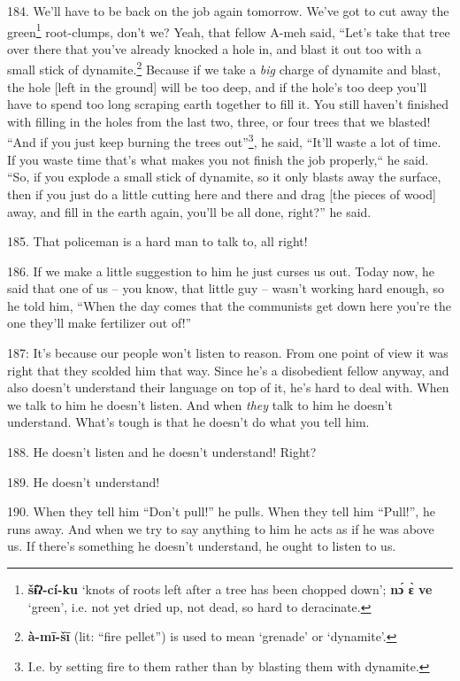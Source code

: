 184. We'll have to be back on the job again tomorrow. We've got to cut away the
green\footnote{\textbf{šɨ̂ʔ-cí-ku} `knots of roots left after a tree has been chopped down'; \textbf{nɔ́ ɛ̀ ve} `green', i.e. not yet dried up, not dead, so hard to deracinate.} root-clumps, don't we? Yeah, that fellow A-meh said, ``Let's
take that tree over there that you've already knocked a hole in, and blast it out
too with a small stick of dynamite.\footnote{\textbf{à-mī-šī} (lit: ``fire pellet'') is used to mean `grenade' or `dynamite'.} Because if we take a \textit{big} charge
of dynamite and blast, the hole [left in the ground] will be too deep, and if the
hole's too deep you'll have to spend too long scraping earth together to fill it.
You still haven't finished with filling in the holes from the last two, three,
or four trees that we blasted! ``And if you just keep burning the trees
out''\footnote{I.e. by setting fire to them rather than by blasting them with dynamite.}, he said, ``It'll waste a lot of time. If you waste time that's
what makes you not finish the job properly,`` he said. ``So, if
you explode a small stick of dynamite, so it only blasts away the surface, then
if you just do a little cutting here and there and drag [the pieces of wood] away,
and fill in the earth again, you'll be all done, right?'' he said.

185. That policeman is a hard man to talk to, all right!

186. If we make a little suggestion to him he just curses us out. Today now, he
said that one of us -- you know, that little guy -- wasn't working hard enough,
so he told him, ``When the day comes that the communists get down here you're the
one they'll make fertilizer out of!''

 187: It's because our people won't listen to reason.
From one point of view it was right that they scolded him that way. Since he's
a disobedient fellow anyway, and also doesn't understand their language on top
of it, he's hard to deal with. When we talk to him he doesn't listen. And when
\textit{they} talk to him he doesn't understand. What's tough is that he doesn't
do what you tell him.

188. He doesn't listen and he doesn't understand! Right?

189. He doesn't understand!

190. When they tell him ``Don't pull!'' he pulls. When they tell
him ``Pull!'', he runs away. And when we try to say anything to
him he acts as if he was above us. If there's something he doesn't understand,
he ought to listen to us.


